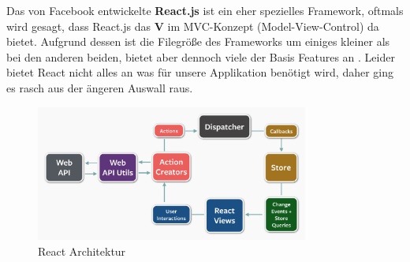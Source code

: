 Das von Facebook entwickelte \textbf{React.js} ist ein eher spezielles Framework, oftmals wird gesagt, dass React.js das \textbf{V} im MVC-Konzept (Model-View-Control) da bietet. Aufgrund dessen ist die Filegröße des Frameworks um einiges kleiner als bei den anderen beiden, bietet aber dennoch viele der Basis Features an \cite{MELD.CH3-web-app.react}. Leider bietet React nicht alles an was für unsere Applikation benötigt wird, daher ging es rasch aus der ängeren Auswall raus.

\begin{figure}[!htb]\centering
	\includegraphics[width=0.8\textwidth]{images/react}
	\caption{React Architektur \cite{MELD.CH3-web-app.react}}
\end{figure}

\clearpage